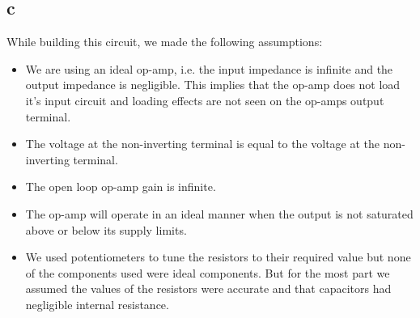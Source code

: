 \documentclass{article}
\theoremstyle{plain}
\theoremstyle{definition}
\theoremstyle{remark}
\begin{document}
\subsection*{c}
While building this circuit, we made the following assumptions:
\begin{itemize}
\item We are using an ideal op-amp, i.e. the input impedance is infinite and the output impedance is negligible. This implies that the op-amp does not load it's input circuit and loading effects are not seen on the op-amps output terminal.

\item The voltage at the non-inverting terminal is equal to the voltage at the non-inverting terminal.

\item The open loop op-amp gain is infinite.

\item The op-amp will operate in an ideal manner when the output is not saturated above or below its supply limits.

\item We used potentiometers to tune the resistors to their required value but none of the components used were ideal components. But for the most part we assumed the values of the resistors were accurate and that capacitors had negligible internal resistance.

\end{itemize}
\end{document}
